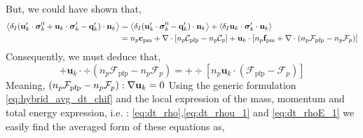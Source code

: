 But, we could have shown that,
\begin{align*}
    \left<\delta_I (\textbf{u}_k' \cdot \bm{\sigma}_k^0 + \textbf{u}_k \cdot \bm{\sigma}_k' - \textbf{q}_k')\cdot \textbf{n}_k\right>
    &= 
    \left<\delta_I (\textbf{u}_k' \cdot \bm{\sigma}_k^0 - \textbf{q}_k')\cdot \textbf{n}_k\right>
    + \left<\delta_I \textbf{u}_k \cdot \bm{\sigma}_k'\cdot \textbf{n}_k\right>\\
    &=
    n_p \textbf{c}_\text{pm} 
    + \mathbf{\nabla}\cdot [n_p \mathcal{C}_\text{pfp} - n_p \mathcal{C}_p]
    + \textbf{u}_k \cdot 
    [n_p \textbf{f}_\text{pm} + \mathbf{\nabla}\cdot (n_p \mathcal{F}_\text{pfp} - n_p \mathcal{F}_p)]\\
\end{align*}
Consequently, we must deduce that, 
\begin{equation*}
    + \textbf{u}_k \cdot \div (n_p \mathcal{F}_\text{pfp} - n_p \mathcal{F}_p)
    = 
    + \div [ n_p \textbf{u}_k \cdot (\mathcal{F}_\text{pfp} - \mathcal{F}_p) ]
\end{equation*}
Meaning, $(n_p \mathcal{F}_\text{pfp} - n_p \mathcal{F}_p) :  \mathbf{\nabla} \textbf{u}_k = 0$
Using the generic formulation \ref{eq:hybrid_avg_dt_chif} and the local expression of the mass, momentum and total energy expression, i.e. : \ref{eq:dt_rho},\ref{eq:dt_rhou_1} and \ref{eq:dt_rhoE_1} we easily find the averaged form of these equations as, 

